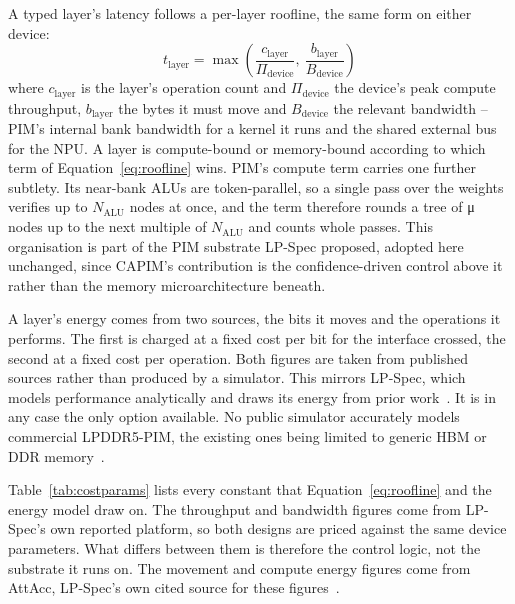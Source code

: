 \documentclass[11pt]{article}
\begin{document}
A typed layer's latency follows a per-layer roofline, the same form on either device:
\begin{equation}
t_{\text{layer}} = \max\!\left( \frac{c_{\text{layer}}}{\Pi_{\text{device}}},\ \frac{b_{\text{layer}}}{B_{\text{device}}} \right)
\label{eq:roofline}
\end{equation}
where $c_{\text{layer}}$ is the layer's operation count and $\Pi_{\text{device}}$ the device's peak compute throughput, $b_{\text{layer}}$ the bytes it must move and $B_{\text{device}}$ the relevant bandwidth -- PIM's internal bank bandwidth for a kernel it runs and the shared external bus for the NPU. A layer is compute-bound or memory-bound according to which term of Equation~\ref{eq:roofline} wins. PIM's compute term carries one further subtlety. Its near-bank ALUs are token-parallel, so a single pass over the weights verifies up to $N_{\text{ALU}}$ nodes at once, and the term therefore rounds a tree of μ nodes up to the next multiple of $N_{\text{ALU}}$ and counts whole passes. This organisation is part of the PIM substrate LP-Spec proposed, adopted here unchanged, since CAPIM's contribution is the confidence-driven control above it rather than the memory microarchitecture beneath.

A layer's energy comes from two sources, the bits it moves and the operations it performs. The first is charged at a fixed cost per bit for the interface crossed, the second at a fixed cost per operation. Both figures are taken from published sources rather than produced by a simulator. This mirrors LP-Spec, which models performance analytically and draws its energy from prior work~\cite{he2025lpspec}. It is in any case the only option available. No public simulator accurately models commercial LPDDR5-PIM, the existing ones being limited to generic HBM or DDR memory~\cite{cha2026lp5x}.

Table~\ref{tab:costparams} lists every constant that Equation~\ref{eq:roofline} and the energy model draw on. The throughput and bandwidth figures come from LP-Spec's own reported platform, so both designs are priced against the same device parameters. What differs between them is therefore the control logic, not the substrate it runs on. The movement and compute energy figures come from AttAcc, LP-Spec's own cited source for these figures~\cite{park2024attacc}.
\end{document}
